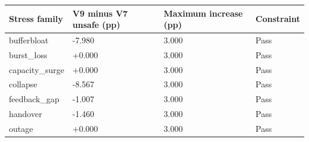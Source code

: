 \begin{tabular}{llll}
\toprule
Stress family & V9 minus V7 unsafe (pp) & Maximum increase (pp) & Constraint \\
\midrule
bufferbloat & -7.980 & 3.000 & Pass \\
burst\_loss & +0.000 & 3.000 & Pass \\
capacity\_surge & +0.000 & 3.000 & Pass \\
collapse & -8.567 & 3.000 & Pass \\
feedback\_gap & -1.007 & 3.000 & Pass \\
handover & -1.460 & 3.000 & Pass \\
outage & +0.000 & 3.000 & Pass \\
\bottomrule
\end{tabular}
